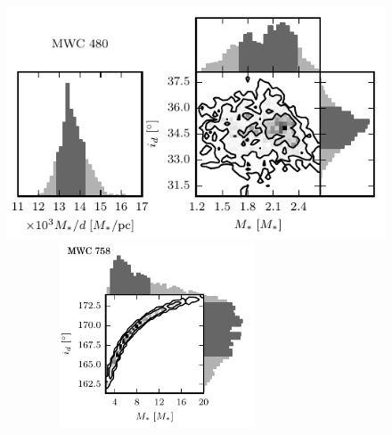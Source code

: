 \documentclass[twocolumn]{aastex6}
\begin{document}
\begin{figure}[htb]
\begin{center}
\includegraphics{MWC480_posterior.pdf}
\includegraphics[draft, width=3.5in, height=2.15in]{MWC758_posterior.pdf}
\end{center}
\end{figure}
\end{document}
